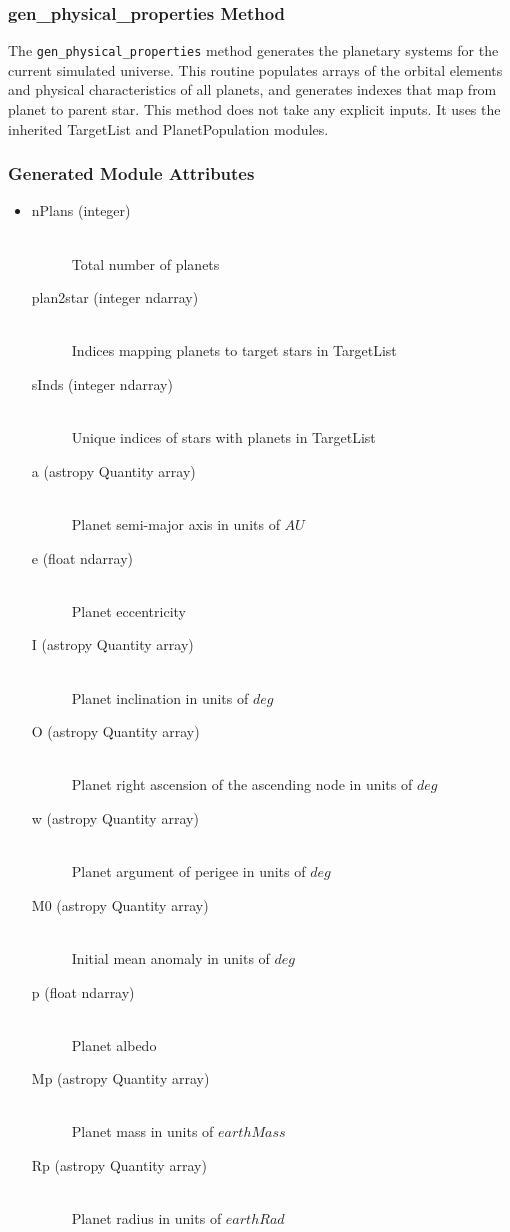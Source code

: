 \documentclass[cleanfoot]{asme2ej}
\begin{document}
\subsubsection{gen\_physical\_properties Method} \label{sec:genphysicalpropertiestask}
The \verb+gen_physical_properties+ method generates the planetary systems for the current simulated universe. This routine populates arrays of the orbital elements and physical characteristics of all planets, and generates indexes that map from planet to parent star. This method does not take any explicit inputs.  It uses the inherited TargetList and PlanetPopulation modules.

\subsubsection*{Generated Module Attributes}
\begin{itemize}
\item 
\begin{description}
    \item[nPlans (integer)] \hfill \\ Total number of planets
    \item[plan2star (integer ndarray)] \hfill \\ Indices mapping planets to target stars in TargetList
    \item[sInds (integer ndarray)] \hfill \\ Unique indices of stars with planets in TargetList
    \item[a (astropy Quantity array)] \hfill \\ Planet semi-major axis in units of $ AU $
    \item[e (float ndarray)] \hfill \\ Planet eccentricity
    \item[I (astropy Quantity array)] \hfill \\ Planet inclination in units of $ deg $
    \item[O (astropy Quantity array)] \hfill \\ Planet right ascension of the ascending node in units of $ deg $
    \item[w (astropy Quantity array)] \hfill \\ Planet argument of perigee in units of $ deg $
    \item[M0 (astropy Quantity array)] \hfill \\ Initial mean anomaly in units of $ deg $
    \item[p (float ndarray)] \hfill \\ Planet albedo
    \item[Mp (astropy Quantity array)] \hfill \\ Planet mass in units of $earthMass$
    \item[Rp (astropy Quantity array)] \hfill \\ Planet radius in units of $earthRad$
\end{description}
\end{itemize}
\end{document}
